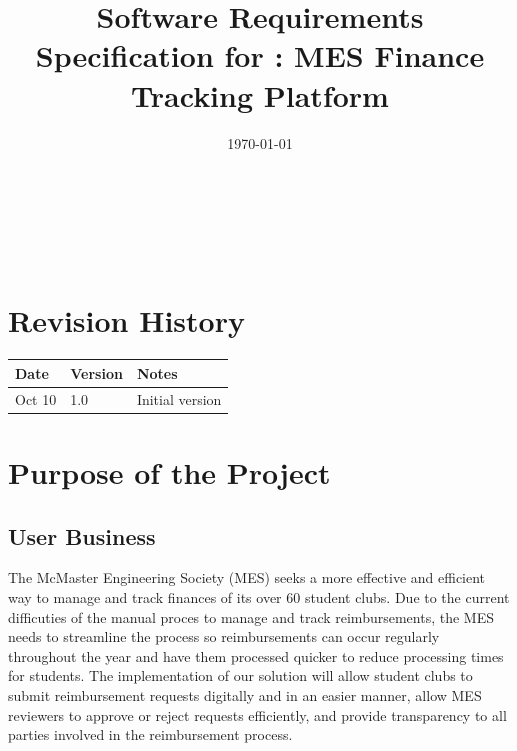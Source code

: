 \documentclass[12pt]{article}
\begin{document}
\title{Software Requirements Specification for \progname: MES Finance Tracking Platform} 
\author{\authname}
\date{\today}
	
\maketitle

~\newpage


\tableofcontents

~\newpage

\section*{Revision History}

\begin{tabularx}{\textwidth}{p{3cm}p{2cm}X}
  \toprule {\bf Date} & {\bf Version} & {\bf Notes}\\
    \midrule
      Oct 10 & 1.0 & Initial version\\
  \bottomrule
\end{tabularx}

\newpage
{}


\section{Purpose of the Project}
  \subsection{User Business}
    The McMaster Engineering Society (MES) seeks a more effective and efficient way to manage and track finances of its over 60 student clubs. Due to the current difficuties of 
    the manual proces to manage and track reimbursements, the MES needs to streamline the process so reimbursements can occur regularly throughout the year and have them processed
    quicker to reduce processing times for students. The implementation of our solution will allow student clubs to submit reimbursement requests digitally and in an easier manner, 
    allow MES reviewers to approve or reject requests efficiently, and provide transparency to all parties involved in the reimbursement process. 
\end{document}
